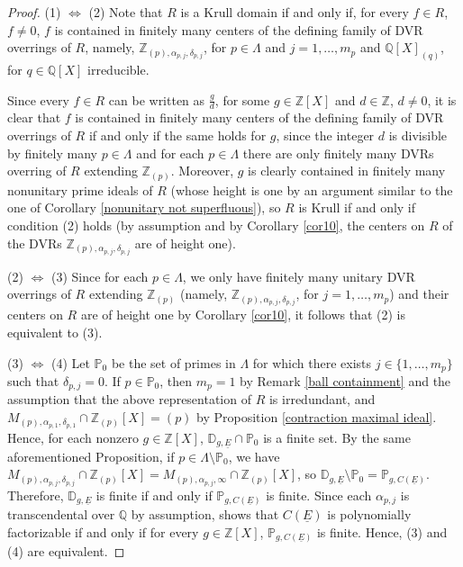 \documentclass[10pt]{article}
\numberwithin{equation}{section}
\theoremstyle{definition}
\theoremstyle{definition}
\newcommand{\Q}{\mathbb{Q}}
\newcommand{\Z}{\mathbb{Z}}
\newcommand{\PP}{\mathbb{P}}
\newcommand{\uE}{\underline{E}}
\begin{document}
\begin{proof}
(1) $\Leftrightarrow$ (2) Note that $R$ is a Krull domain if and only if, for every $f\in R$, $f\not=0$, 
$f$ is contained in finitely many centers of the defining family of DVR overrings of $R$, 
namely, $\Z_{(p),\alpha_{p,j},\delta_{p,j}}$, for $p\in\Lambda$ and $j=1,\ldots,m_p$ 
and $\Q[X]_{(q)}$, for $q\in\Q[X]$ irreducible.

 Since every $f\in R$ can be written as $\frac{g}{d}$, for some $g\in\Z[X]$    
 and $d\in\Z$, $d\not=0$, it is clear that $f$ is contained in finitely many centers of the defining family of DVR overrings of $R$ if and only if the same holds for $g$, 
 since the integer $d$ is divisible by finitely many $p\in\Lambda$ and for each $p\in\Lambda$ there are only finitely many DVRs overring of $R$ extending $\Z_{(p)}$. 
 Moreover, $g$ is clearly contained in finitely many nonunitary prime ideals of $R$ (whose height is one by an argument similar 
 to the one of  Corollary \ref{nonunitary not superfluous}), so $R$ is Krull if and only if condition (2) holds (by assumption and  by Corollary \ref{cor10}, the centers on $R$ of the DVRs $\Z_{(p),\alpha_{p,j},\delta_{p,j}}$ are of height one).

(2) $\Leftrightarrow$ (3)
 Since for each $p\in\Lambda$, we only have finitely many unitary DVR overrings of $R$ extending $\Z_{(p)}$ 
 (namely, $\Z_{(p),\alpha_{p,j},\delta_{p,j}}$, for $j=1,\ldots,m_p$) and their centers on $R$ are of height one by Corollary \ref{cor10}, it follows that (2) is equivalent to (3).

(3) $\Leftrightarrow$ (4)
 Let $\PP_0$ be the set of primes in $\Lambda$ for which there exists $j\in\{1,\ldots,m_p\}$ such that $\delta_{p,j}=0$. If $p \in \PP_0$, then $m_p =1$ 
 by Remark \ref{ball containment} and the assumption that the above  representation of $R$ is irredundant, and $M_{(p),\alpha_{p,1},\delta_{p,1}}\cap\Z_{(p)}[X]=(p)$ by Proposition \ref{contraction maximal ideal}. Hence, for each nonzero $g\in\Z[X]$, $\mathbb D_{g,\uE}\cap\PP_0$ is a finite set. By the same aforementioned Proposition, if $p\in\Lambda \setminus\PP_0$, we have $M_{(p),\alpha_{p,j},\delta_{p,j}}\cap\Z_{(p)}[X]=M_{(p),\alpha_{p,j},\infty}\cap\Z_{(p)}[X]$, so $\mathbb D_{g,\uE}\setminus\PP_0=\PP_{g,C(\uE)}$. Therefore, $\mathbb D_{g,\uE}$ is finite if and only if $\PP_{g,C(\uE)}$ is finite. Since each $\alpha_{p,j}$ is transcendental over $\Q$ by assumption,  \cite[Lemma 2.12]{PerDedekind} shows that  $C(\uE)$ is polynomially factorizable if and only if  for every $g\in\Z[X]$, $\PP_{g,C(\uE)}$ is finite. Hence, (3) and (4) are equivalent. %
\end{proof}
\end{document}
